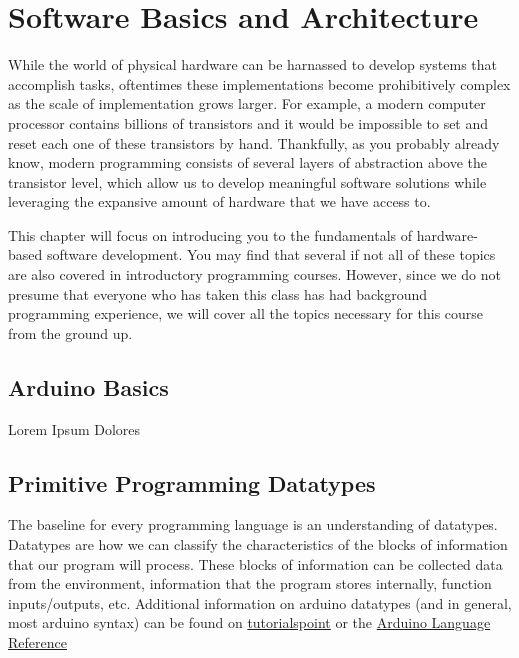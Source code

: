 %

\chapter{Software Basics and Architecture}
\setchapterpreamble[u]{\margintoc}

While the world of physical hardware can be harnassed to develop systems that accomplish tasks, oftentimes these implementations become prohibitively complex as the scale of
implementation grows larger. For example, a modern computer processor contains billions of transistors and it would be impossible to set and reset each one of these transistors
by hand. Thankfully, as you probably already know, modern programming consists of several layers of abstraction above the transistor level, which allow us to develop meaningful
software solutions while leveraging the expansive amount of hardware that we have access to.

This chapter will focus on introducing you to the fundamentals of hardware-based software development. You may find that several if not all of these topics are also covered in
introductory programming courses. However, since we do not presume that everyone who has taken this class has had background programming experience, we will cover all the topics
necessary for this course from the ground up.

\section{Arduino Basics} 
Lorem Ipsum Dolores

\section{Primitive Programming Datatypes} 
The baseline for every programming language is an understanding of datatypes.
Datatypes are how we can classify the characteristics of the blocks of information that our program will process.
These blocks of information can be collected data from the environment, information that the program stores internally, function inputs/outputs, etc.
Additional information on arduino datatypes (and in general, most arduino syntax) can be found on
\href{https://www.tutorialspoint.com/arduino/arduino_data_types.htm}{tutorialspoint} or the \href{https://www.arduino.cc/reference/en/}{Arduino Language Reference}

